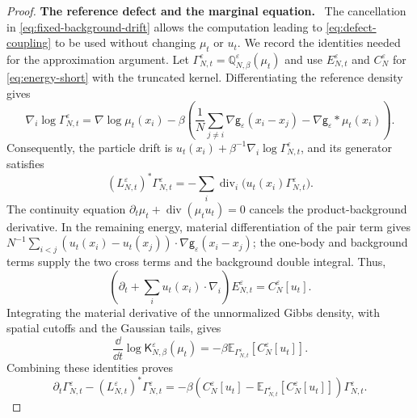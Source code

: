 \documentclass[11pt,reqno]{amsart}
\numberwithin{equation}{section}
\theoremstyle{plain}
\theoremstyle{remark}
\newcommand{\E}{\mathbb E}\newcommand{\Q}{\mathbb Q}\newcommand{\Pb}{\mathbb P}
\newcommand{\K}{\mathsf K}\newcommand{\g}{\mathsf g}\newcommand{\Fr}{\mathsf F}
\DeclareMathOperator{\diver}{div}
\newcommand{\parheading}[1]{\par\medskip\noindent\textbf{#1}\ }
\begin{document}
\begin{proof}
\parheading{The reference defect and the marginal equation.}
The cancellation in \eqref{eq:fixed-background-drift} allows the computation leading to \eqref{eq:defect-coupling} to be used without changing $\mu_t$ or $u_t$. We record the identities needed for the approximation argument. Let $\Gamma_{N,t}^\varepsilon=\Q_{N,\beta}^\varepsilon(\mu_t)$ and use $E_{N,t}^\varepsilon$ and $C_N^\varepsilon$ for \eqref{eq:energy-short} with the truncated kernel. Differentiating the reference density gives
\begin{equation}\label{eq:fixed-background-score}
 \nabla_i\log\Gamma_{N,t}^\varepsilon
 =\nabla\log\mu_t(x_i)-\beta\left(
 \frac1N\sum_{j\ne i}\nabla\g_\varepsilon(x_i-x_j)
 -\nabla\g_\varepsilon*\mu_t(x_i)\right).
\end{equation}
Consequently, the particle drift is $u_t(x_i)+\beta^{-1}\nabla_i\log\Gamma_{N,t}^\varepsilon$, and its generator satisfies
\begin{equation}\label{eq:fixed-background-generator}
 (L_{N,t}^\varepsilon)^*\Gamma_{N,t}^\varepsilon
 =-\sum_i\diver_i\bigl(u_t(x_i)\Gamma_{N,t}^\varepsilon\bigr).
\end{equation}
The continuity equation $\partial_t\mu_t+\diver(\mu_tu_t)=0$ cancels the product-background derivative. In the remaining energy, material differentiation of the pair term gives
$N^{-1}\sum_{i<j}(u_t(x_i)-u_t(x_j))\cdot\nabla\g_\varepsilon(x_i-x_j)$; the one-body and background terms supply the two cross terms and the background double integral. Thus,
\begin{equation}\label{eq:fixed-background-material-energy}
 \left(\partial_t+\sum_i u_t(x_i)\cdot\nabla_i\right)E_{N,t}^\varepsilon
 =C_N^\varepsilon[u_t].
\end{equation}
Integrating the material derivative of the unnormalized Gibbs density, with spatial cutoffs and the Gaussian tails, gives
\begin{equation}\label{eq:fixed-background-normalizer}
 \frac{\dd}{\dd t}\log\K_{N,\beta}^\varepsilon(\mu_t)
 =-\beta\E_{\Gamma_{N,t}^\varepsilon}[C_N^\varepsilon[u_t]].
\end{equation}
Combining these identities proves
\begin{equation}\label{eq:fixed-background-defect}
 \partial_t\Gamma_{N,t}^\varepsilon-(L_{N,t}^\varepsilon)^*\Gamma_{N,t}^\varepsilon
 =-\beta\left(C_N^\varepsilon[u_t]
 -\E_{\Gamma_{N,t}^\varepsilon}[C_N^\varepsilon[u_t]]\right)\Gamma_{N,t}^\varepsilon.
\end{equation}


\end{proof}
\end{document}
